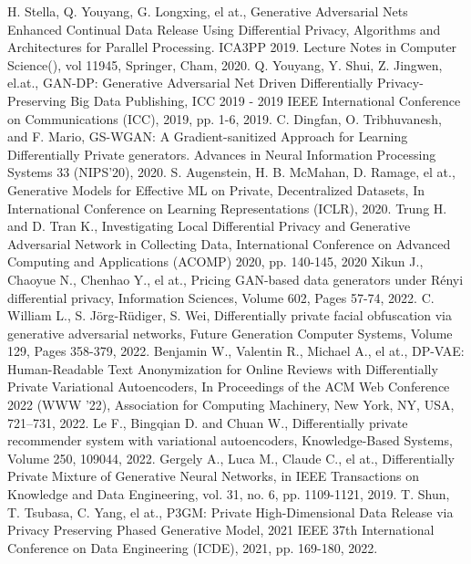 \documentclass[conference]{IEEEtran}
\begin{document}
\begin{thebibliography}{00}
 H. Stella, Q. Youyang, G. Longxing, el at., Generative Adversarial Nets Enhanced Continual Data Release Using Differential Privacy, Algorithms and Architectures for Parallel Processing. ICA3PP 2019. Lecture Notes in Computer Science(), vol 11945, Springer, Cham, 2020.
 Q. Youyang, Y. Shui, Z. Jingwen, el.at., GAN-DP: Generative Adversarial Net Driven Differentially Privacy-Preserving Big Data Publishing, ICC 2019 - 2019 IEEE International Conference on Communications (ICC), 2019, pp. 1-6, 2019.
 C. Dingfan, O. Tribhuvanesh, and F. Mario, GS-WGAN: A Gradient-sanitized Approach for Learning Differentially Private generators. Advances in Neural Information Processing Systems 33 (NIPS'20), 2020.
 S. Augenstein, H. B. McMahan, D. Ramage, el at., Generative Models for Effective ML on Private, Decentralized Datasets, In International Conference on Learning Representations (ICLR), 2020.
 Trung H. and D. Tran K., Investigating Local Differential Privacy and Generative Adversarial Network in Collecting Data, International Conference on Advanced Computing and Applications (ACOMP) 2020, pp. 140-145, 2020
 Xikun J., Chaoyue N., Chenhao Y., el at., Pricing GAN-based data generators under Rényi differential privacy, Information Sciences, Volume 602, Pages 57-74, 2022.
 C. William L., S. Jörg-Rüdiger, S. Wei, Differentially private facial obfuscation via generative adversarial networks,
Future Generation Computer Systems, Volume 129, Pages 358-379, 2022.
 Benjamin W., Valentin R., Michael A., el at.,  DP-VAE: Human-Readable Text Anonymization for Online Reviews with Differentially Private Variational Autoencoders, In Proceedings of the ACM Web Conference 2022 (WWW '22), Association for Computing Machinery, New York, NY, USA, 721–731, 2022.
 Le F., Bingqian D. and Chuan W., Differentially private recommender system with variational autoencoders, Knowledge-Based Systems, Volume 250, 109044, 2022.
 Gergely A., Luca M., Claude C., el at., Differentially Private Mixture of Generative Neural Networks, in IEEE Transactions on Knowledge and Data Engineering, vol. 31, no. 6, pp. 1109-1121, 2019.
 T. Shun, T. Tsubasa, C. Yang, el at., P3GM: Private High-Dimensional Data Release via Privacy Preserving Phased Generative Model, 2021 IEEE 37th International Conference on Data Engineering (ICDE), 2021, pp. 169-180, 2022.

\end{thebibliography}
\end{document}
